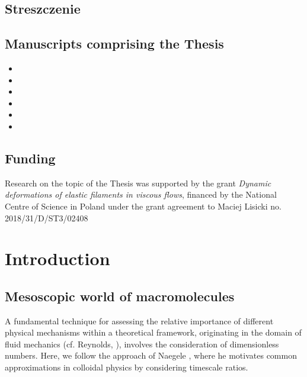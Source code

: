 \documentclass{doctoral}
\begin{document}
\section*{Streszczenie}

\clearpage

\section*{Manuscripts comprising the Thesis}

\begin{itemize}
    \item {}
    \item {}
    \item {}
    \item {}
    \item {}
    \item {}
\end{itemize}

\vspace*{\fill}

\section*{Funding}
Research on the topic of the Thesis was supported by the grant \emph{Dynamic deformations of elastic filaments in viscous flows}, financed by the National Centre of Science in Poland under the grant agreement to Maciej Lisicki no.
2018/31/D/ST3/02408
\clearpage

\tableofcontents

\chapter{Introduction}

\section{Mesoscopic world of macromolecules}

A fundamental technique for assessing the relative importance of different physical mechanisms within a theoretical framework, originating in the domain of fluid mechanics (cf.
Reynolds, \cite{Reynolds_1883}), involves the consideration of dimensionless numbers.
Here, we follow the approach of Naegele \cite{Nagele_2013}, where he motivates common approximations in colloidal physics by considering timescale ratios.
\end{document}
